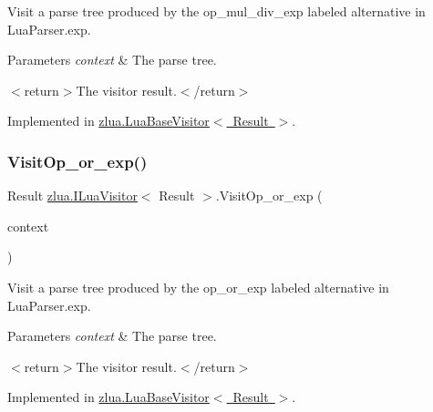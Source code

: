 Visit a parse tree produced by the {\ttfamily op\+\_\+mul\+\_\+div\+\_\+exp} labeled alternative in Lua\+Parser.\+exp. 


\begin{DoxyParams}{Parameters}
{\em context} & The parse tree.\\
\hline
\end{DoxyParams}
$<$return$>$The visitor result.$<$/return$>$ 

Implemented in \mbox{\hyperlink{classzlua_1_1_lua_base_visitor_aeebcee477db462f0670252868b88fc35}{zlua.\+Lua\+Base\+Visitor$<$ Result $>$}}.

\mbox{\label{interfacezlua_1_1_i_lua_visitor_a5be60a214f1dc7a39004e5d741ef50b4}} 
\subsubsection{\texorpdfstring{Visit\+Op\+\_\+or\+\_\+exp()}{VisitOp\_or\_exp()}}
{\footnotesize\ttfamily Result \mbox{\hyperlink{interfacezlua_1_1_i_lua_visitor}{zlua.\+I\+Lua\+Visitor}}$<$ Result $>$.Visit\+Op\+\_\+or\+\_\+exp (\begin{DoxyParamCaption}\item[{\mbox{[}\+Not\+Null\mbox{]} \mbox{\hyperlink{classzlua_1_1_lua_parser_1_1_op__or__exp_context}{Lua\+Parser.\+Op\+\_\+or\+\_\+exp\+Context}}}]{context }\end{DoxyParamCaption})}



Visit a parse tree produced by the {\ttfamily op\+\_\+or\+\_\+exp} labeled alternative in Lua\+Parser.\+exp. 


\begin{DoxyParams}{Parameters}
{\em context} & The parse tree.\\
\hline
\end{DoxyParams}
$<$return$>$The visitor result.$<$/return$>$ 

Implemented in \mbox{\hyperlink{classzlua_1_1_lua_base_visitor_a46d6ab454b46b7fa9b6a2ebda7514299}{zlua.\+Lua\+Base\+Visitor$<$ Result $>$}}.

\mbox{\label{interfacezlua_1_1_i_lua_visitor_a492c5985ab1023b73ab337f585308f67}} 
